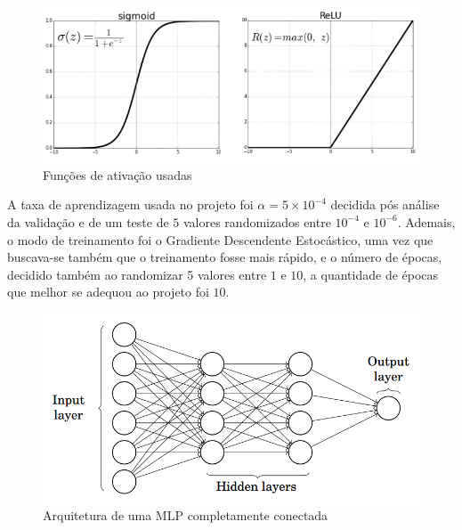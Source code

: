 \begin{figure}[!h]
    \centering
    \includegraphics[scale=0.35]{Imagens/ativacao.png}
    \caption{Funções de ativação usadas}
    \label{ativacao}
\end{figure}


A taxa de aprendizagem usada no projeto foi $\alpha = 5\times 10^{-4}$ decidida pós análise da validação e de um teste de $5$ valores randomizados entre $10^{-4}$ e $10^{-6}$. Ademais, o modo de treinamento foi o Gradiente Descendente Estocástico, uma vez que buscava-se também que o treinamento fosse mais rápido, e o número de épocas, decidido também ao randomizar 5 valores entre $1$ e $10$, a quantidade de épocas que melhor se adequou ao projeto foi $10$.

\begin{figure}[!h]
    \centering
    \includegraphics[scale=0.40]{Imagens/neural.png}
    \caption{Arquitetura de uma MLP completamente conectada}
    \label{mlp}
\end{figure}
